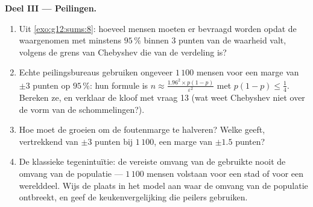 \begin{problem}
\medskip
\noindent\textbf{Deel III --- Peilingen.}
\begin{enumerate}[resume]
  \item Uit \cref{exo:g12:sums:8}: hoeveel mensen moeten er bevraagd worden
        opdat de waargenomen  met  minstens $95\,\%$ binnen $3$
        punten van de waarheid valt, volgens de grens van Chebyshev die van de
        verdeling  is?
  \item Echte peilingsbureaus gebruiken ongeveer $1\,100$ mensen voor een
        marge van $\pm 3$ punten op $95\,\%$: hun formule is
        $n \approx \frac{1.96^2 \times p(1-p)}{\varepsilon^2}$ met
        $p(1-p) \leq \frac14$. Bereken ze, en verklaar de kloof met vraag 13
        (wat weet Chebyshev niet over de vorm van de schommelingen?).
  \item Hoe moet de  groeien om de foutenmarge te halveren? Welke
         geeft, vertrekkend van $\pm 3$ punten bij $1\,100$, een
        marge van $\pm 1.5$ punten?
  \item De klassieke tegenintuïtie: de vereiste omvang van de 
        gebruikte nooit de omvang van de populatie --- $1\,100$ mensen
        volstaan voor een stad of voor een werelddeel. Wijs de plaats in het
        model aan waar de omvang van de populatie ontbreekt, en geef de
        keukenvergelijking die peilers gebruiken.
\end{enumerate}


\end{problem}
